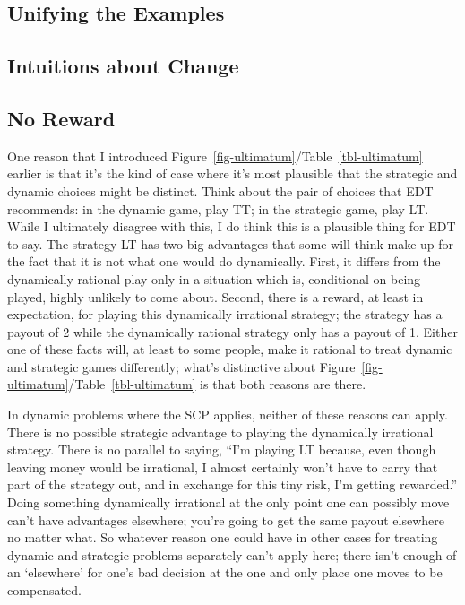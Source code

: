 \documentclass[
  10pt,
  letterpaper,
  DIV=11,
  numbers=noendperiod,
  twoside]{scrartcl}
\begin{document}
\subsection{Unifying the Examples}\label{unifying-the-examples}

\subsection{Intuitions about Change}\label{intuitions-about-change}

\subsection{No Reward}\label{no-reward}

One reason that I introduced
Figure~\ref{fig-ultimatum}/Table~\ref{tbl-ultimatum} earlier is that
it's the kind of case where it's most plausible that the strategic and
dynamic choices might be distinct. Think about the pair of choices that
EDT recommends: in the dynamic game, play TT; in the strategic game,
play LT. While I ultimately disagree with this, I do think this is a
plausible thing for EDT to say. The strategy LT has two big advantages
that some will think make up for the fact that it is not what one would
do dynamically. First, it differs from the dynamically rational play
only in a situation which is, conditional on being played, highly
unlikely to come about. Second, there is a reward, at least in
expectation, for playing this dynamically irrational strategy; the
strategy has a payout of 2 while the dynamically rational strategy only
has a payout of 1. Either one of these facts will, at least to some
people, make it rational to treat dynamic and strategic games
differently; what's distinctive about
Figure~\ref{fig-ultimatum}/Table~\ref{tbl-ultimatum} is that both
reasons are there.

In dynamic problems where the SCP applies, neither of these reasons can
apply. There is no possible strategic advantage to playing the
dynamically irrational strategy. There is no parallel to saying, ``I'm
playing LT because, even though leaving money would be irrational, I
almost certainly won't have to carry that part of the strategy out, and
in exchange for this tiny risk, I'm getting rewarded.'' Doing something
dynamically irrational at the only point one can possibly move can't
have advantages elsewhere; you're going to get the same payout elsewhere
no matter what. So whatever reason one could have in other cases for
treating dynamic and strategic problems separately can't apply here;
there isn't enough of an `elsewhere' for one's bad decision at the one
and only place one moves to be compensated.
\end{document}
